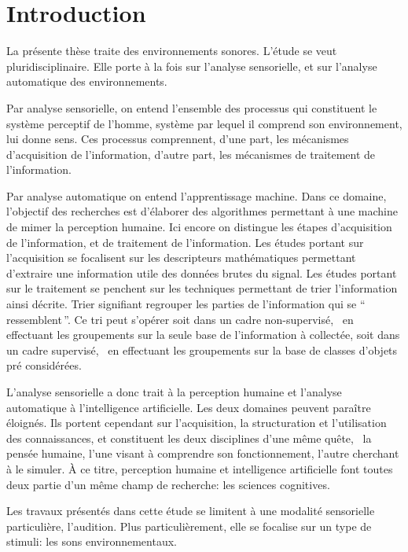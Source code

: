 \chapter{Introduction}\label{ch:pream_intro}

La présente thèse traite des environnements sonores. L'étude se veut pluridisciplinaire. Elle porte à la fois sur l'analyse sensorielle, et sur l'analyse automatique des environnements.

Par analyse sensorielle, on entend l'ensemble des processus qui constituent le système perceptif de l'homme, système par lequel il comprend son environnement, lui donne sens. Ces processus comprennent, d'une part, les mécanismes d'acquisition de l'information, d'autre part, les mécanismes de traitement de l'information.

Par analyse automatique on entend l'apprentissage machine. Dans ce domaine, l'objectif des recherches est d'élaborer des algorithmes permettant à une machine de mimer la perception humaine. Ici encore on distingue les étapes d'acquisition de l'information, et de traitement de l'information. Les études portant sur l'acquisition se focalisent sur les descripteurs mathématiques permettant d'extraire une information utile des données brutes du signal. Les études portant sur le traitement se penchent sur les techniques permettant de trier l'information ainsi décrite. Trier signifiant regrouper les parties de l'information qui se ``\,ressemblent\,''. Ce tri peut s'opérer soit dans un cadre non-supervisé, \ie~en effectuant les groupements sur la seule base de l'information à collectée, soit dans un cadre supervisé, \ie~en effectuant les groupements sur la base de classes d'objets pré considérées.

L'analyse sensorielle a donc trait à la perception humaine et l'analyse automatique à l'intelligence artificielle. Les deux domaines peuvent paraître éloignés. Ils portent cependant sur l'acquisition, la structuration et l'utilisation des connaissances, et constituent les deux disciplines d'une même quête, \ie~la pensée humaine, l'une visant à comprendre son fonctionnement, l'autre cherchant à le simuler. À ce titre, perception humaine et intelligence artificielle font toutes deux partie d'un même champ de recherche: les sciences cognitives.

Les travaux présentés dans cette étude se limitent à une modalité sensorielle particulière, l'audition. Plus particulièrement, elle se focalise sur un type de stimuli: les sons environnementaux. 

